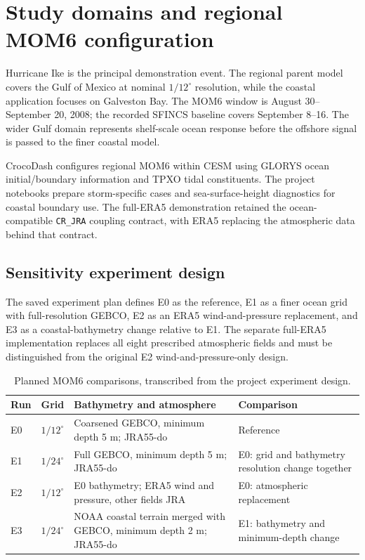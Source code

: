 \documentclass[11pt]{article}
\newcommand{\code}[1]{\texttt{#1}}
\begin{document}
\section{Study domains and regional MOM6 configuration}

Hurricane Ike is the principal demonstration event. The regional parent model covers the Gulf of Mexico at nominal $1/12^{\circ}$ resolution, while the coastal application focuses on Galveston Bay. The MOM6 window is August 30--September 20, 2008; the recorded SFINCS baseline covers September 8--16. The wider Gulf domain represents shelf-scale ocean response before the offshore signal is passed to the finer coastal model.

CrocoDash configures regional MOM6 within CESM using GLORYS ocean initial/boundary information and TPXO tidal constituents. The project notebooks prepare storm-specific cases and sea-surface-height diagnostics for coastal boundary use. The full-ERA5 demonstration retained the ocean-compatible \code{CR\_JRA} coupling contract, with ERA5 replacing the atmospheric data behind that contract.

\subsection{Sensitivity experiment design}

The saved experiment plan defines E0 as the reference, E1 as a finer ocean grid with full-resolution GEBCO, E2 as an ERA5 wind-and-pressure replacement, and E3 as a coastal-bathymetry change relative to E1. The separate full-ERA5 implementation replaces all eight prescribed atmospheric fields and must be distinguished from the original E2 wind-and-pressure-only design.

\begin{table}[htbp]
\centering
\caption{Planned MOM6 comparisons, transcribed from the project experiment design.}
\begin{tabularx}{\textwidth}{@{}L{0.10\textwidth}L{0.15\textwidth}Y L{0.19\textwidth}@{}}
\toprule
\textbf{Run} & \textbf{Grid} & \textbf{Bathymetry and atmosphere} & \textbf{Comparison} \\
\midrule
E0 & $1/12^{\circ}$ & Coarsened GEBCO, minimum depth 5 m; JRA55-do & Reference \\
E1 & $1/24^{\circ}$ & Full GEBCO, minimum depth 5 m; JRA55-do & E0: grid and bathymetry resolution change together \\
E2 & $1/12^{\circ}$ & E0 bathymetry; ERA5 wind and pressure, other fields JRA & E0: atmospheric replacement \\
E3 & $1/24^{\circ}$ & NOAA coastal terrain merged with GEBCO, minimum depth 2 m; JRA55-do & E1: bathymetry and minimum-depth change \\
\bottomrule
\end{tabularx}
\end{table}
\end{document}
